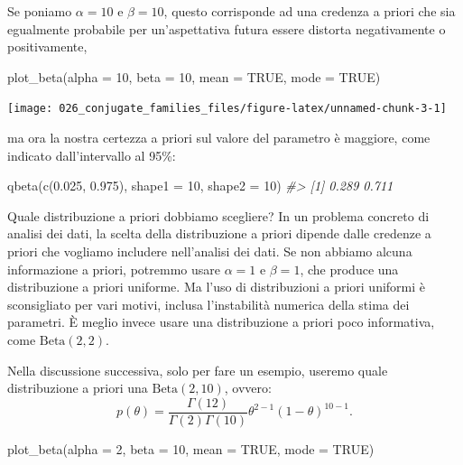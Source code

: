 \documentclass[
  10pt,
  italian,
  a4paper,
  extrafontsizes,onecolumn,openright
  ]{memoir}
\newenvironment{Shaded}{\begin{snugshade}}{\end{snugshade}}
\newcommand{\AttributeTok}[1]{\textcolor[rgb]{0.77,0.63,0.00}{#1}}
\newcommand{\CommentTok}[1]{\textcolor[rgb]{0.56,0.35,0.01}{\textit{#1}}}
\newcommand{\ConstantTok}[1]{\textcolor[rgb]{0.00,0.00,0.00}{#1}}
\newcommand{\DecValTok}[1]{\textcolor[rgb]{0.00,0.00,0.81}{#1}}
\newcommand{\FloatTok}[1]{\textcolor[rgb]{0.00,0.00,0.81}{#1}}
\newcommand{\FunctionTok}[1]{\textcolor[rgb]{0.00,0.00,0.00}{#1}}
\newcommand{\NormalTok}[1]{#1}
\theoremstyle{definition}
\theoremstyle{definition}
\theoremstyle{definition}
\theoremstyle{definition}
\theoremstyle{remark}
\begin{document}
Se poniamo \(\alpha=10\) e \(\beta=10\), questo corrisponde ad una credenza a priori che sia egualmente probabile per un'aspettativa futura essere distorta negativamente o positivamente,

\begin{Shaded}
\begin{Highlighting}[]
\FunctionTok{plot\_beta}\NormalTok{(}\AttributeTok{alpha =} \DecValTok{10}\NormalTok{, }\AttributeTok{beta =} \DecValTok{10}\NormalTok{, }\AttributeTok{mean =} \ConstantTok{TRUE}\NormalTok{, }\AttributeTok{mode =} \ConstantTok{TRUE}\NormalTok{)}
\end{Highlighting}
\end{Shaded}

\begin{center}\texttt{[image: 026\_conjugate\_families\_files/figure-latex/unnamed-chunk-3-1]} \end{center}

\noindent
ma ora la nostra certezza a priori sul valore del parametro è maggiore, come indicato dall'intervallo al 95\%:

\begin{Shaded}
\begin{Highlighting}[]
\FunctionTok{qbeta}\NormalTok{(}\FunctionTok{c}\NormalTok{(}\FloatTok{0.025}\NormalTok{, }\FloatTok{0.975}\NormalTok{), }\AttributeTok{shape1 =} \DecValTok{10}\NormalTok{, }\AttributeTok{shape2 =} \DecValTok{10}\NormalTok{)}
\CommentTok{\#\textgreater{} [1] 0.289 0.711}
\end{Highlighting}
\end{Shaded}

Quale distribuzione a priori dobbiamo scegliere? In un problema concreto di analisi dei dati, la scelta della distribuzione a priori dipende dalle credenze a priori che vogliamo includere nell'analisi dei dati. Se non abbiamo alcuna informazione a priori, potremmo usare \(\alpha=1\) e \(\beta=1\), che produce una distribuzione a priori uniforme. Ma l'uso di distribuzioni a priori uniformi è sconsigliato per vari motivi, inclusa l'instabilità numerica della stima dei parametri. È meglio invece usare una distribuzione a priori poco informativa, come \(\mbox{Beta}(2, 2)\).

Nella discussione successiva, solo per fare un esempio, useremo quale distribuzione a priori una \(\mbox{Beta}(2, 10)\), ovvero:
\[
p(\theta) = \frac{\Gamma(12)}{\Gamma(2)\Gamma(10)}\theta^{2-1} (1-\theta)^{10-1}.
\]

\begin{Shaded}
\begin{Highlighting}[]
\FunctionTok{plot\_beta}\NormalTok{(}\AttributeTok{alpha =} \DecValTok{2}\NormalTok{, }\AttributeTok{beta =} \DecValTok{10}\NormalTok{, }\AttributeTok{mean =} \ConstantTok{TRUE}\NormalTok{, }\AttributeTok{mode =} \ConstantTok{TRUE}\NormalTok{)}
\end{Highlighting}
\end{Shaded}
\end{document}
